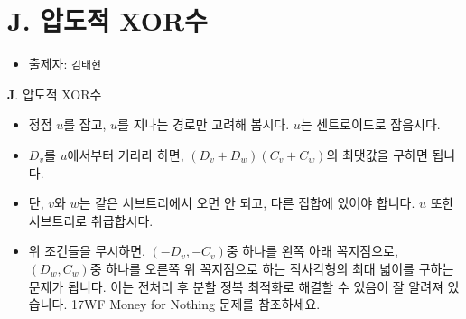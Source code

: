 \section{J. 압도적 XOR수}

\begin{frame} %
    \begin{itemize}
        \item 출제자: \texttt{김태현}
    \end{itemize}
\end{frame}

\begin{frame}{\textbf{J}. 압도적 XOR수}
    \begin{itemize}
        \item 정점 $u$를 잡고, $u$를 지나는 경로만 고려해 봅시다. $u$는 센트로이드로 잡읍시다.
        \item $D_v$를 $u$에서부터 거리라 하면, $(D_v+D_w)(C_v+C_w)$의 최댓값을 구하면 됩니다.
        \item 단, $v$와 $w$는 같은 서브트리에서 오면 안 되고, 다른 집합에 있어야 합니다. $u$ 또한 서브트리로 취급합시다.
        \item 위 조건들을 무시하면, $(-D_v,-C_v)$중 하나를 왼쪽 아래 꼭지점으로, $(D_w,C_w)$중 하나를 오른쪽 위 꼭지점으로 하는 직사각형의 최대 넓이를 구하는 문제가 됩니다. 이는 전처리 후 분할 정복 최적화로 해결할 수 있음이 잘 알려져 있습니다. 17WF Money for Nothing 문제를 참조하세요.
    \end{itemize}
\end{frame}
